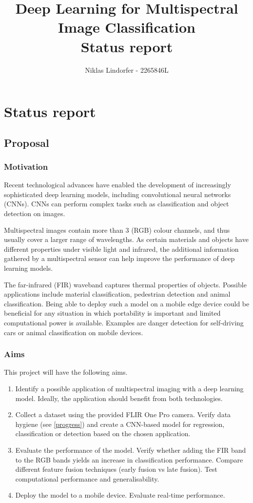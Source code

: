 \documentclass[11pt]{article}
\title{
    Deep Learning for Multispectral Image Classification \\
    \large{Status report}
}
\author{Niklas Lindorfer - 2265846L}
\begin{document}
\maketitle


\section{Status report}

\subsection{Proposal}\label{proposal}

\subsubsection{Motivation}\label{motivation}

Recent technological advances have enabled the development of increasingly sophisticated deep learning models, including convolutional neural networks (CNNs). 
CNNs can perform complex tasks such as classification and object detection on images.

Multispectral images contain more than 3 (RGB) colour channels, and thus usually cover a larger range of wavelengths. As certain materials and objects have different properties under visible light and infrared, the additional information gathered by a multispectral sensor can help improve the performance of deep learning models.

The far-infrared (FIR) waveband captures thermal properties of objects. Possible applications include material classification, pedestrian detection and animal classification. Being able to deploy such a model on a mobile edge device could be beneficial for any situation in which portability is important and limited computational power is available. Examples are danger detection for self-driving cars or animal classification on mobile devices.

\subsubsection{Aims}\label{aims}

This project will have the following aims.

\begin{enumerate}
    \item Identify a possible application of multispectral imaging with a deep learning model. Ideally, the application should benefit from both technologies.
    \item Collect a dataset using the provided FLIR One Pro camera. Verify data hygiene (see \ref{progress}) and create a CNN-based model for regression, classification or detection based on the chosen application.
    \item Evaluate the performance of the model. Verify whether adding the FIR band to the RGB bands yields an increase in classification performance. Compare different feature fusion techniques (early fusion vs late fusion). Test computational performance and generalisability.
    \item Deploy the model to a mobile device. Evaluate real-time performance.
\end{enumerate}
\end{document}
